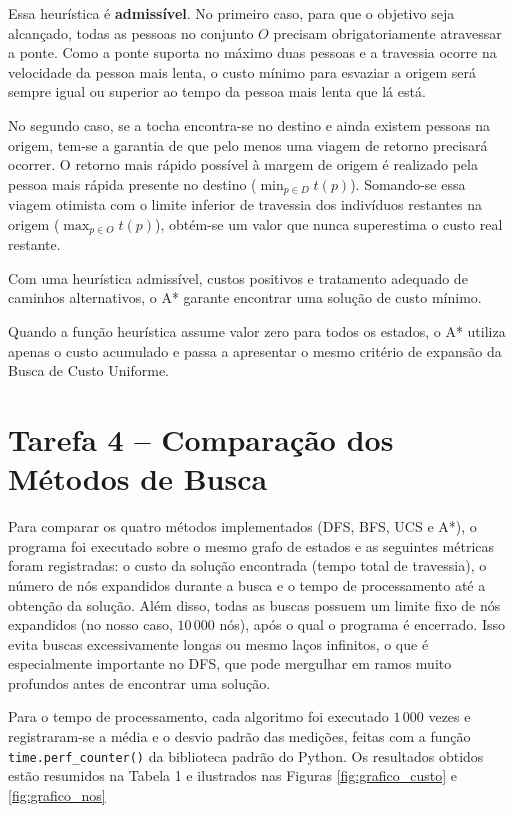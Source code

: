 \documentclass{article}
\begin{document}
Essa heurística é \textbf{admissível}. No primeiro caso, 
para que o objetivo seja alcançado, todas as pessoas no 
conjunto $O$ precisam obrigatoriamente atravessar a ponte. 
Como a ponte suporta no máximo duas pessoas e a travessia 
ocorre na velocidade da pessoa mais lenta, o custo mínimo 
para esvaziar a origem será sempre igual ou superior ao 
tempo da pessoa mais lenta que lá está. 

No segundo caso, se a tocha encontra-se no destino e ainda 
existem pessoas na origem, tem-se a garantia de que pelo 
menos uma viagem de retorno precisará ocorrer. O retorno mais 
rápido possível à margem de origem é realizado pela pessoa 
mais rápida presente no destino ($\min_{p \in D} t(p)$). 
Somando-se essa viagem otimista com o limite inferior de 
travessia dos indivíduos restantes na origem ($\max_{p \in O} t(p)$), 
obtém-se um valor que nunca superestima o custo real restante.

Com uma heurística admissível, custos positivos
e tratamento adequado de caminhos alternativos,
o A* garante encontrar uma solução de custo mínimo.

Quando a função heurística assume valor zero
para todos os estados, o A* utiliza apenas o
custo acumulado e passa a apresentar o mesmo
critério de expansão da Busca de Custo Uniforme.

\section{Tarefa 4 -- Comparação dos Métodos de Busca}

Para comparar os quatro métodos implementados (DFS, BFS, UCS e A*),
o programa foi executado sobre o mesmo grafo de estados e as seguintes
métricas foram registradas: o custo da solução encontrada (tempo total
de travessia), o número de nós expandidos durante a busca e o tempo de
processamento até a obtenção da solução. Além disso, todas as buscas
possuem um limite fixo de nós expandidos (no nosso caso, $10\,000$ nós),
após o qual o programa é encerrado. Isso evita buscas excessivamente
longas ou mesmo laços infinitos, o que é especialmente importante no
DFS, que pode mergulhar em ramos muito profundos antes de encontrar
uma solução.

Para o tempo de processamento, cada algoritmo foi executado $1\,000$
vezes e registraram-se a média e o desvio padrão das medições, feitas
com a função \texttt{time.perf\_counter()} da biblioteca padrão do
Python. Os resultados obtidos estão resumidos na Tabela 1
e ilustrados nas Figuras \ref{fig:grafico_custo} e \ref{fig:grafico_nos}
\end{document}
